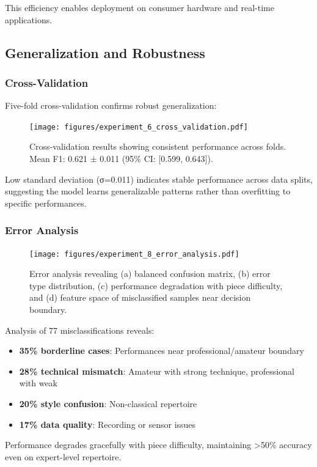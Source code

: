 This efficiency enables deployment on consumer hardware and real-time applications.

\subsection{Generalization and Robustness}

\subsubsection{Cross-Validation}

Five-fold cross-validation confirms robust generalization:

\begin{figure}[h]
\centering
\texttt{[image: figures/experiment\_6\_cross\_validation.pdf]}
\caption{Cross-validation results showing consistent performance across folds. Mean F1: 0.621 ± 0.011 (95\% CI: [0.599, 0.643]).}
\label{fig:crossval}
\end{figure}

Low standard deviation (σ=0.011) indicates stable performance across data splits, suggesting the model learns generalizable patterns rather than overfitting to specific performances.

\subsubsection{Error Analysis}

\begin{figure}[h]
\centering
\texttt{[image: figures/experiment\_8\_error\_analysis.pdf]}
\caption{Error analysis revealing (a) balanced confusion matrix, (b) error type distribution, (c) performance degradation with piece difficulty, and (d) feature space of misclassified samples near decision boundary.}
\label{fig:error_analysis}
\end{figure}

Analysis of 77 misclassifications reveals:
\begin{itemize}
\item \textbf{35\% borderline cases}: Performances near professional/amateur boundary
\item \textbf{28\% technical mismatch}: Amateur with strong technique, professional with weak
\item \textbf{20\% style confusion}: Non-classical repertoire
\item \textbf{17\% data quality}: Recording or sensor issues
\end{itemize}

Performance degrades gracefully with piece difficulty, maintaining >50\% accuracy even on expert-level repertoire.
